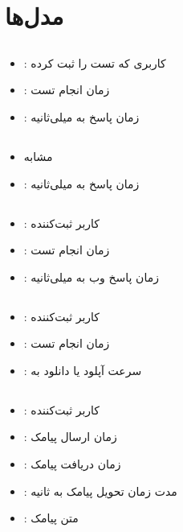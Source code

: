 \documentclass{report}
\begin{document}
\section{مدل‌ها}
\subsection{}
\begin{itemize}
    \item {}: کاربری که تست را ثبت کرده
    \item {}: زمان انجام تست
    \item {}: زمان پاسخ  به میلی‌ثانیه
\end{itemize}

\subsection{}
\begin{itemize}
    \item مشابه 
    \item {}: زمان پاسخ  به میلی‌ثانیه
\end{itemize}

\subsection{}
\begin{itemize}
    \item {}: کاربر ثبت‌کننده
    \item {}: زمان انجام تست
    \item {}: زمان پاسخ وب به میلی‌ثانیه
\end{itemize}

\subsection{}
\begin{itemize}
    \item {}: کاربر ثبت‌کننده
    \item {}: زمان انجام تست
    \item {}: سرعت آپلود یا دانلود به 
\end{itemize}

\subsection{}
\begin{itemize}
    \item {}: کاربر ثبت‌کننده
    \item {}: زمان ارسال پیامک
    \item {}: زمان دریافت پیامک
    \item {}: مدت زمان تحویل پیامک به ثانیه
    \item {}: متن پیامک
\end{itemize}
\end{document}

